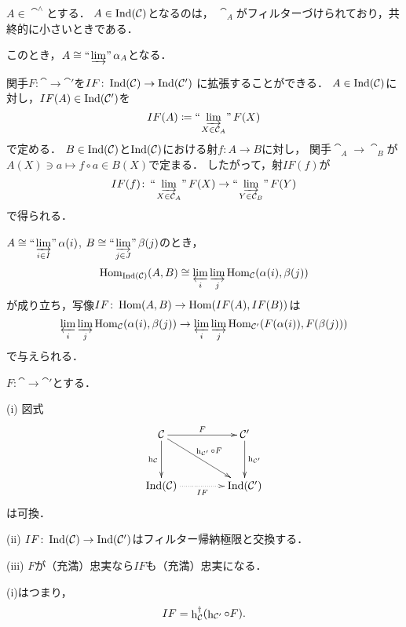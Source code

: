 \begin{Proposition}
    $A\in\cat^\wedge$とする．
    $A\in\mathop{\mathrm{Ind}}(\mathcal{C})$となるのは，
    $\cat_A$がフィルターづけられており，共終的に小さいときである．
\end{Proposition}
このとき，$A\cong\mathop{\text{``}\hspace{-0.7pt}\varinjlim\hspace{-1.5pt}\text{''}}\alpha_A$となる．

関手$F\colon\cat\to\cat'$を$IF\colon\mathop{\mathrm{Ind}}(\mathcal{C})\to\mathop{\mathrm{Ind}}(\mathcal{C}')$
に拡張することができる．
$A\in\mathop{\mathrm{Ind}}(\mathcal{C})$に対し，$IF(A)\in\mathop{\mathrm{Ind}}(\mathcal{C}')$を
\begin{equation*}
    IF(A)\coloneqq\ind<\varinjlim_{X\in\cat_A}>F(X)
\end{equation*}
で定める．
$B\in\mathop{\mathrm{Ind}}(\mathcal{C})$と$\mathop{\mathrm{Ind}}(\mathcal{C})$における射$f\colon A\to B$に対し，
関手$\cat_A\to\cat_B$が$A(X)\ni a\mapsto f\circ a\in B(X)$で定まる．
したがって，射$IF(f)$が
\begin{equation*}
    IF(f)\colon
    \ind<\varinjlim_{X\in\cat_A}>F(X)
    \to
    \ind<\varinjlim_{Y\in\cat_B}>F(Y)
\end{equation*}
で得られる．

$A\cong\ind<\varinjlim_{i\in I}>\alpha(i)$, 
$B\cong\ind<\varinjlim_{j\in J}>\beta(j)$のとき，
\begin{equation*}
    \mathop{\mathrm{Hom}}\nolimits_{\mathop{\mathrm{Ind}}(\mathcal{C})}(A,B)
    \cong
    \varprojlim_i\varinjlim_j\mathop{\mathrm{Hom}}\nolimits_{\mathcal{C}}(\alpha(i),\beta(j))
\end{equation*}
が成り立ち，写像$IF\colon\mathop{\mathrm{Hom}}\nolimits(A,B)\to\mathop{\mathrm{Hom}}\nolimits(IF(A),IF(B))$は
\begin{equation*}
    \varprojlim_i\varinjlim_j\mathop{\mathrm{Hom}}\nolimits_{\mathcal{C}}(\alpha(i),\beta(j))
    \to
    \varprojlim_i\varinjlim_j\mathop{\mathrm{Hom}}\nolimits_{\mathcal{C}'}(F(\alpha(i)),F(\beta(j)))
\end{equation*}
で与えられる．


\begin{Proposition}
    $F\colon\cat\to\cat'$とする．

    (i) 
    図式
    \begin{equation}
        \vcenter{\xymatrix@C=40pt@R=32pt{
        \cat
        \ar[r]^-{F}
        \ar[rd]^-{\hh_{\cat'}\circ F}
        \ar[d]_-{\hh_{\cat}}
        &\cat'
        \ar[d]^-{\hh_{\cat'}}
        \\
        \Ind(\cat)
        \ar@{.>}[r]_-{IF}
        &
        \Ind(\cat')
        }}
    \end{equation}
    は可換．

    (ii) 
    $IF\colon\mathop{\mathrm{Ind}}(\mathcal{C})\to\mathop{\mathrm{Ind}}(\mathcal{C}')$はフィルター帰納極限と交換する．

    (iii) 
    $F$が（充満）忠実なら$IF$も（充満）忠実になる．
\end{Proposition}
(i)はつまり，
\begin{equation*}
    IF=\mathop{\mathrm{h}}\nolimits_{\mathcal{C}}^\dag(\mathop{\mathrm{h}}\nolimits_{\mathcal{C}'}\circ F).
\end{equation*}

